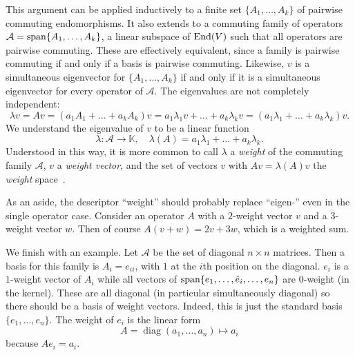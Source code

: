 This argument can be applied inductively to a finite set $\{A_1,\dots,A_k\}$ of pairwise commuting endomorphisms.
It also extends to a commuting family of operators $\mathcal{A} = \operatorname{span}\{A_1,\dots,A_k\}$, a linear subspace of $\operatorname{End}(V)$ such that all operators are pairwise commuting.
These are effectively equivalent, since a family is pairwise commuting if and only if a basis is pairwise commuting.
Likewise, $v$ is a simultaneous eigenvector for $\{A_1,\dots,A_k\}$ if and only if it is a simultaneous eigenvector for every operator of $\mathcal{A}$.
The eigenvalues are not completely independent:
\[
\lambda v
= Av 
= (a_1A_1 + \dots + a_kA_k)v
= a_1 \lambda_1 v + \dots + a_k \lambda_k v
= (a_1 \lambda_1 + \dots + a_k \lambda_k )v.
\]
We understand the eigenvalue of $v$ to be a linear function 
\[
\lambda : \mathcal{A} \to \mathbb{K}, 
\quad
\lambda(A) = a_1 \lambda_1 + \dots + a_k \lambda_k .
\]
Understood in this way, it is more common to call $\lambda$ a \emph{weight} of the commuting family $\mathcal{A}$, $v$ a \emph{weight vector}, and the set of vectors $v$ with $Av = \lambda(A)v$ the \emph{weight} space~\cite[Definition~A.14]{Hall2015}.

As an aside, the descriptor ``weight'' should probably replace ``eigen-'' even in the single operator case.
Consider an operator $A$ with a $2$-weight vector $v$ and a $3$-weight vector $w$.
Then of course $A(v+w) = 2v + 3w$, which is a weighted sum.

We finish with an example.
Let $\mathcal{A}$ be the set of diagonal $n\times n$ matrices.
Then a basis for this family is $A_i = e_{ii}$, with $1$ at the $i$th position on the diagonal.
$e_i$ is a $1$-weight vector of $A_i$ while all vectors of $\operatorname{span}\{e_1,\dots,\hat{e}_i,\dots,e_n\}$ are $0$-weight (in the kernel).
These are all diagonal (in particular simultaneously diagonal) so there should be a basis of weight vectors.
Indeed, this is just the standard basis $\{e_1,\dots,e_n\}$.
The weight of $e_i$ is the linear form
\[
A = \operatorname{diag}(a_1,\dots,a_n) \mapsto a_i
\]
because $A e_i = a_i$.

